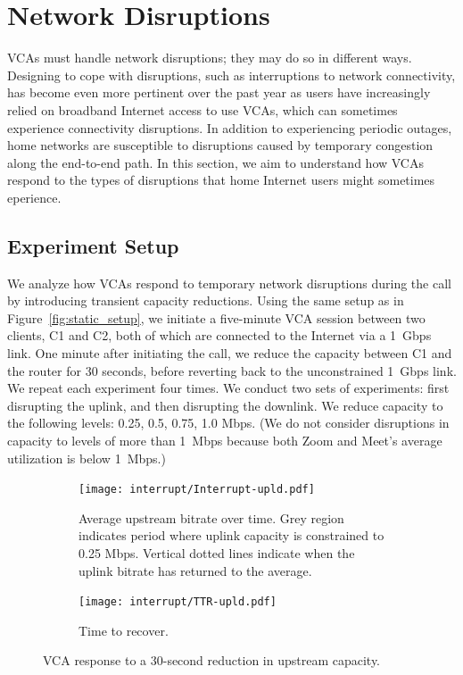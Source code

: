 

\section{Network Disruptions}
\label{sec:interruption}

VCAs must handle network disruptions; they may do so in different ways.
Designing to cope with disruptions, such as interruptions to network
connectivity, has become even more pertinent over the past year as users have
increasingly relied on broadband Internet access to use VCAs, which can
sometimes experience connectivity disruptions.  In addition to experiencing
periodic outages, home networks are susceptible to disruptions caused by
temporary congestion along the end-to-end path.
In this section, we aim to understand how VCAs respond to the types of
disruptions that home Internet users might sometimes eperience. 


\subsection{Experiment Setup}

We analyze how
VCAs respond to temporary network disruptions during the call by introducing
transient capacity reductions. Using the same setup as in
Figure~\ref{fig:static_setup}, we initiate a five-minute VCA session between
two clients, C1 and C2, both of which are connected to the Internet via a
1~Gbps link. One minute after initiating the call, we reduce the capacity
between C1 and the router for 30 seconds, before reverting back to the
unconstrained 1~Gbps link. We repeat each experiment four times.
We conduct two sets of experiments: first disrupting the uplink, and then
disrupting the downlink. We reduce capacity to the following
levels: {0.25, 0.5, 0.75, 1.0} Mbps. (We do not consider disruptions in capacity
to levels of more than 1~Mbps because both Zoom and Meet's average utilization
is below 1~Mbps.)

\begin{figure}[t!]
\centering
\begin{subfigure}[t]{.5\textwidth}
    \centering
    \texttt{[image: interrupt/Interrupt-upld.pdf]}
    \caption{Average upstream bitrate over time. Grey region indicates period where uplink capacity is constrained to 0.25 Mbps. Vertical dotted lines indicate when the uplink bitrate has returned to the average.}
    \label{fig:ts_upld}
\end{subfigure}\hfill
\begin{subfigure}[t]{.5\textwidth}
      \centering
    \texttt{[image: interrupt/TTR-upld.pdf]}
    \caption{Time to recover.}
    \label{fig:TTR_upld}
\end{subfigure}
\caption{VCA response to a 30-second reduction in upstream capacity.}
\label{fig:interrupt-upld}
\end{figure}


